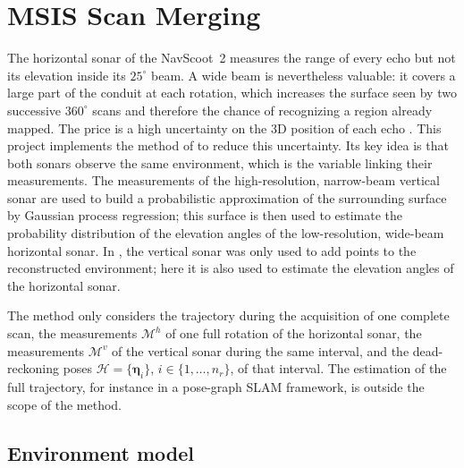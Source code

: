 \section{MSIS Scan Merging}              %
\label{sec:msis_merging}                 %

The horizontal sonar of the NavScoot~2 measures the range of every echo but not its elevation
inside its $25^\circ$ beam. A wide beam is nevertheless valuable:
it covers a large part of the conduit at each rotation, which increases the surface seen by two
successive $360^\circ$ scans and therefore the chance of recognizing a region already mapped. The
price is a high uncertainty on the 3D position of each echo \citep{breux2020elevation}. This
project implements the method of \citet{breux2020elevation} to reduce this uncertainty. Its key
idea is that both sonars observe the same environment, which is the variable linking their
measurements. The measurements of the high-resolution, narrow-beam vertical sonar are used to build
a probabilistic approximation of the surrounding surface by Gaussian process regression; this
surface is then used to estimate the probability distribution of the elevation angles of the
low-resolution, wide-beam horizontal sonar. In \citet{margaritis2025internship}, the vertical sonar
was only used to add points to the reconstructed environment; here it is also used to estimate the
elevation angles of the horizontal sonar.

The method only considers the trajectory during the acquisition of one complete scan, the measurements $\mathcal{M}^h$ of one full rotation of the
horizontal sonar, the measurements $\mathcal{M}^v$ of the vertical sonar during the same interval,
and the dead-reckoning poses $\mathcal{H} = \{\boldsymbol{\eta}_i\}$, $i \in \{1,\dots,n_r\}$, of
that interval. The estimation of the full trajectory, for instance in a pose-graph SLAM framework,
is outside the scope of the method.

\subsection{Environment model}           %
\label{sec:msis_model}                   %

